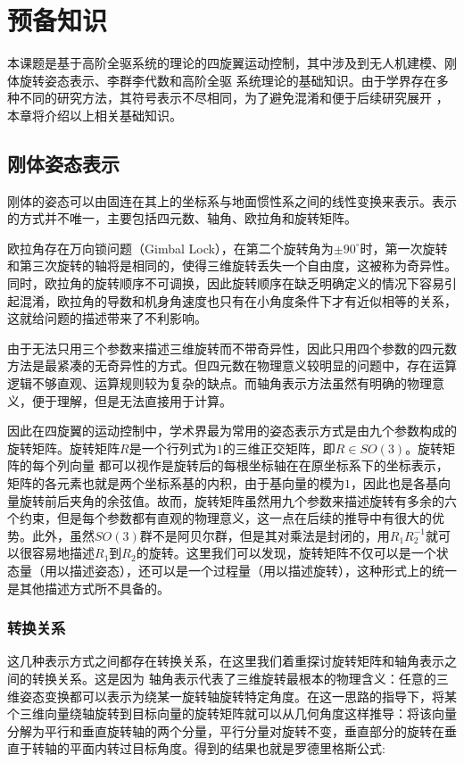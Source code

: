 
\chapter{预备知识}
  本课题是基于高阶全驱系统的理论的四旋翼运动控制，其中涉及到无人机建模、刚体旋转姿态表示、李群李代数和高阶全驱
  系统理论的基础知识。由于学界存在多种不同的研究方法，其符号表示不尽相同，为了避免混淆和便于后续研究展开 ，本章将介绍以上相关基础知识。
  \section{刚体姿态表示}
  刚体的姿态可以由固连在其上的坐标系与地面惯性系之间的线性变换来表示。表示的方式并不唯一，主要包括四元数、轴角、欧拉角和旋转矩阵\cite{attitude}。
  
  欧拉角存在万向锁问题（Gimbal Lock），在第二个旋转角为$\pm 90^{\circ}$时，第一次旋转和第三次旋转的轴将是相同的，使得三维旋转丢失一个自由度，这被称为奇异性。同时，欧拉角的旋转顺序不可调换，因此旋转顺序在缺乏明确定义的情况下容易引起混淆，欧拉角的导数和机身角速度也只有在小角度条件下才有近似相等的关系，这就给问题的描述带来了不利影响。
  
  由于无法只用三个参数来描述三维旋转而不带奇异性，因此只用四个参数的四元数方法是最紧凑的无奇异性的方式。但四元数在物理意义较明显的问题中，存在运算逻辑不够直观、运算规则较为复杂的缺点。而轴角表示方法虽然有明确的物理意义，便于理解，但是无法直接用于计算。

  因此在四旋翼的运动控制中，学术界最为常用的姿态表示方式是由九个参数构成的旋转矩阵。旋转矩阵$R$是一个行列式为$1$的三维正交矩阵，即$R\in SO(3)$。旋转矩阵的每个列向量  都可以视作是旋转后的每根坐标轴在在原坐标系下的坐标表示，矩阵的各元素也就是两个坐标系基的内积，由于基向量的模为$1$，因此也是各基向量旋转前后夹角的余弦值。故而，旋转矩阵虽然用九个参数来描述旋转有多余的六个约束，但是每个参数都有直观的物理意义，这一点在后续的推导中有很大的优势。此外，虽然$SO(3)$群不是阿贝尔群，但是其对乘法是封闭的，用$R_1R_2^{-1}$就可以很容易地描述$R_1$到$R_2$的旋转。这里我们可以发现，旋转矩阵不仅可以是一个状态量（用以描述姿态），还可以是一个过程量（用以描述旋转），这种形式上的统一是其他描述方式所不具备的。

  \subsection{转换关系}
  这几种表示方式之间都存在转换关系，在这里我们着重探讨旋转矩阵和轴角表示之间的转换关系。这是因为
  轴角表示代表了三维旋转最根本的物理含义：任意的三维姿态变换都可以表示为绕某一旋转轴旋转特定角度。在这一思路的指导下，将某个三维向量绕轴旋转到目标向量的旋转矩阵就可以从几何角度这样推导：将该向量分解为平行和垂直旋转轴的两个分量，平行分量对旋转不变，垂直部分的旋转在垂直于转轴的平面内转过目标角度。得到的结果也就是罗德里格斯公式\cite{Rodrigues1840}:

